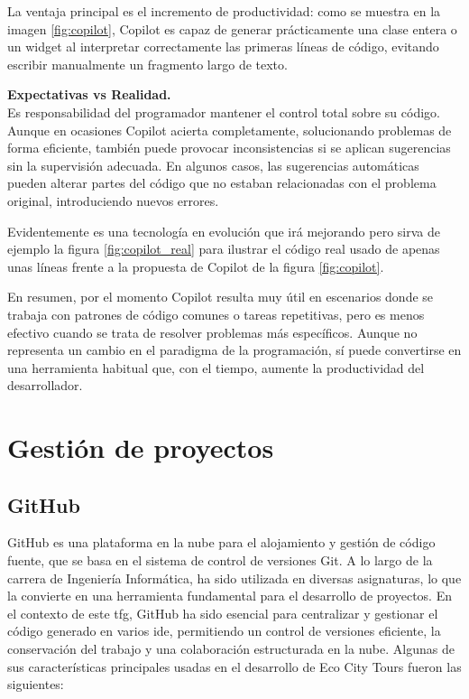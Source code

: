 	La ventaja principal es el incremento de productividad: como se muestra en la imagen \ref{fig:copilot}, Copilot es capaz de generar prácticamente una clase entera o un widget al interpretar correctamente las primeras líneas de código, evitando escribir manualmente un fragmento largo de texto.
	
	\textbf{Expectativas vs Realidad.}\\
	Es responsabilidad del programador mantener el control total sobre su código. Aunque en ocasiones Copilot acierta completamente, solucionando problemas de forma eficiente, también puede provocar inconsistencias si se aplican sugerencias sin la supervisión adecuada. En algunos casos, las sugerencias automáticas pueden alterar partes del código que no estaban relacionadas con el problema original, introduciendo nuevos errores.
	
	Evidentemente es una tecnología en evolución que irá mejorando pero sirva de ejemplo la figura \ref{fig:copilot_real} para ilustrar el código real usado de apenas unas líneas frente a la propuesta de Copilot de la figura \ref{fig:copilot}.
	
	En resumen, por el momento Copilot resulta muy útil en escenarios donde se trabaja con patrones de código comunes o tareas repetitivas, pero es menos efectivo cuando se trata de resolver problemas más específicos. Aunque no representa un cambio en el paradigma de la programación, sí puede convertirse en una herramienta habitual que, con el tiempo, aumente la productividad del desarrollador.

\section{Gestión de proyectos}
	\subsection{GitHub}
	GitHub es una plataforma en la nube para el alojamiento y gestión de código fuente, que se basa en el sistema de control de versiones Git. A lo largo de la carrera de Ingeniería Informática, ha sido utilizada en diversas asignaturas, lo que la convierte en una herramienta fundamental para el desarrollo de proyectos. En el contexto de este \acrshort{tfg}, GitHub ha sido esencial para centralizar y gestionar el código generado en varios \acrshort{ide}, permitiendo un control de versiones eficiente, la conservación del trabajo y una colaboración estructurada en la nube. Algunas de sus características principales usadas en el desarrollo de Eco City Tours fueron las siguientes: 
	
